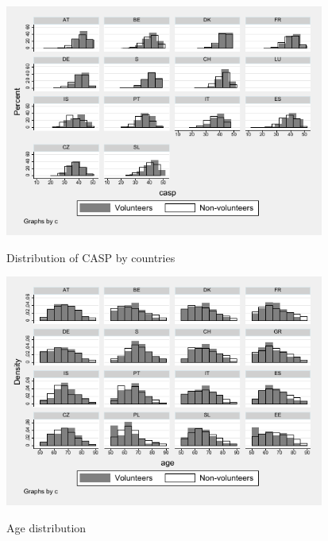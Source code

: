 \documentclass[10pt, letterpaper]{article}
\begin{document}
\begin{spacing}{1.4}
\begin{spacing}{.9}
\begin{figure}[H]
 \includegraphics[height=3in]{hist_casp.pdf}
 \centering
 \label{fig:hist_casp}
\caption{Distribution of CASP by countries}
\end{figure}

\begin{spacing}{.9}
	 
      \label{KendallCasp} 
\end{spacing}




 

\begin{figure}[H]
 \includegraphics[height=3in]{hist_age.pdf}
 \centering
 \label{fig:hist_age}
\caption{Age distribution}
\end{figure}


\begin{spacing}{.9}
\centering 
\begin{scriptsize} 
	 
      \label{StatEdu} 
\end{scriptsize}
\end{spacing}



\end{spacing}
\end{spacing}
\end{document}

